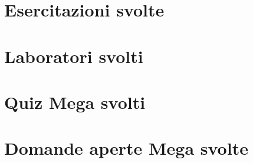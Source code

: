 \documentclass[a4paper,12pt]{report}
\begin{document}
    

    
    
    
    



\part{Esercitazioni svolte} \setcounter{chapter}{0}


\part{Laboratori svolti} \setcounter{chapter}{0}

\part{Quiz Mega svolti} \setcounter{chapter}{0}

\part{Domande aperte Mega svolte} \setcounter{chapter}{0}
\end{document}
